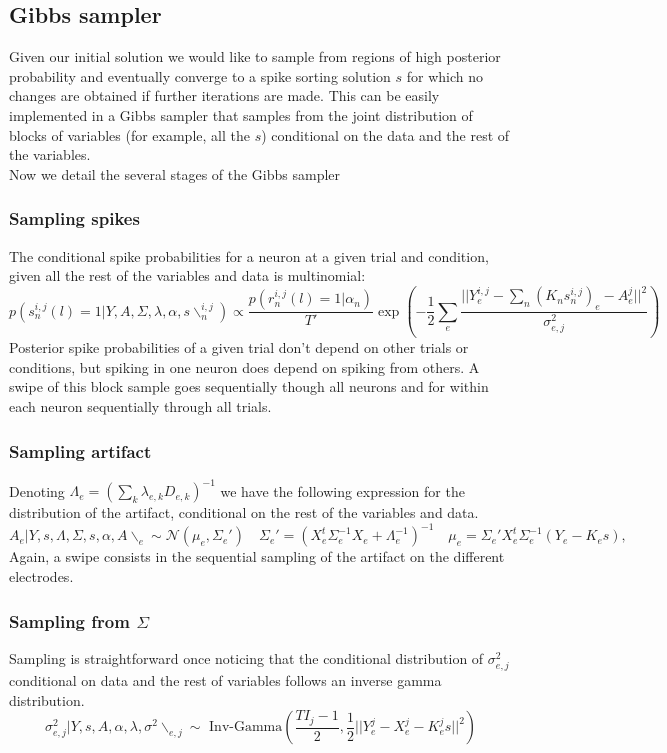 \documentclass[12pt,letterpaper,fleqn]{article}
\begin{document}
\subsection{Gibbs sampler}
Given our initial solution we would like to sample from regions of high posterior probability and eventually converge to a spike sorting solution $s$ for which no changes are obtained if further iterations are made. This can be easily implemented in a Gibbs sampler  that samples from the joint distribution of blocks of variables (for example, all the $s$) conditional on the data and the rest of the variables. \\Now we detail the several stages of the Gibbs sampler
\subsubsection{Sampling spikes}
The conditional spike probabilities for a neuron at a given trial and condition, given all the rest of the variables and data is multinomial:
$$p(s_n^{i,j}(l)=1|Y,A,\Sigma,\lambda,\alpha,s\backslash_{n}^{i,j})\propto \frac{p(r_n^{i,j}(l)=1|\alpha_n)}{T'}\exp\left(-\frac{1}{2}\sum_e \frac{||Y_e^{i,j}-\sum_n (K_n  s_n^{i,j})_e-A^j_e||^2}{\sigma^2_{e,j}}\right)$$
Posterior spike probabilities of a given trial don't depend on other trials or conditions, but spiking in one neuron does depend on spiking from others. A swipe of this block sample goes sequentially though all neurons and for within each neuron sequentially through all trials. 
\subsubsection{Sampling artifact}
Denoting $\Lambda_e=\left(\sum_k \lambda_{e,k} D_{e,k}\right)^{-1}$ we have the following expression for the distribution of the artifact, conditional on the rest of the variables and data.
$$A_e|Y,s,\Lambda,\Sigma,s,\alpha,A\backslash_{e}\sim \mathcal{N}(\mu_e,\Sigma_e')\quad \Sigma_e'=\left(X_e^t\Sigma_e^{-1}X_e+\Lambda_e^{-1}\right)^{-1}\quad \mu_e=\Sigma_e'X_e^t\Sigma_e^{-1}(Y_e-K_es),$$
Again, a swipe consists in the sequential sampling of the artifact on the different electrodes.
\subsubsection{Sampling from $\Sigma$}
Sampling is straightforward once noticing that the conditional distribution of $\sigma^2_{e,j}$ conditional on data and the rest of variables follows an inverse gamma distribution.
$$\sigma^2_{e,j}|Y,s,A,\alpha,\lambda,\sigma^2\backslash_{e,j}\sim\text{ Inv-Gamma}\left(\frac{T I_j-1}{2},\frac{1}{2}||Y_e^j-X_e^j-K_e^js||^2\right)$$
\end{document}
